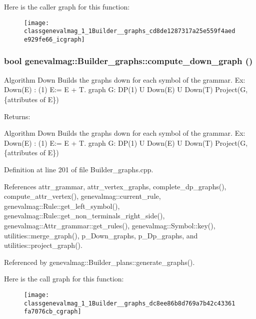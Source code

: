 Here is the caller graph for this function:\nopagebreak
\begin{figure}[H]
\begin{center}
\leavevmode
\texttt{[image: classgenevalmag\_1\_1Builder\_\_graphs\_cd8de1287317a25e559f4aede929fe66\_icgraph]}
\end{center}
\end{figure}
\hypertarget{classgenevalmag_1_1Builder__graphs_dc8ee86b8d769a7b42c43361fa7076cb}{
\subsubsection[{compute\_\-down\_\-graph}]{\setlength{\rightskip}{0pt plus 5cm}bool genevalmag::Builder\_\-graphs::compute\_\-down\_\-graph ()}}
\label{classgenevalmag_1_1Builder__graphs_dc8ee86b8d769a7b42c43361fa7076cb}


Algorithm Down Builds the graphs down for each symbol of the grammar. Ex: Down(E) : (1) E:= E + T. graph G: DP(1) U Down(E) U Down(T) Project(G,\{attributes of E\}) \begin{Desc}
\item[Returns:]\end{Desc}
Algorithm Down Builds the graphs down for each symbol of the grammar. Ex: Down(E) : (1) E:= E + T. graph G: DP(1) U Down(E) U Down(T) Project(G,\{attributes of E\}) 

Definition at line 201 of file Builder\_\-graphs.cpp.

References attr\_\-grammar, attr\_\-vertex\_\-graphs, complete\_\-dp\_\-graphs(), compute\_\-attr\_\-vertex(), genevalmag::current\_\-rule, genevalmag::Rule::get\_\-left\_\-symbol(), genevalmag::Rule::get\_\-non\_\-terminals\_\-right\_\-side(), genevalmag::Attr\_\-grammar::get\_\-rules(), genevalmag::Symbol::key(), utilities::merge\_\-graph(), p\_\-Down\_\-graphs, p\_\-Dp\_\-graphs, and utilities::project\_\-graph().

Referenced by genevalmag::Builder\_\-plans::generate\_\-graphs().

Here is the call graph for this function:\nopagebreak
\begin{figure}[H]
\begin{center}
\leavevmode
\texttt{[image: classgenevalmag\_1\_1Builder\_\_graphs\_dc8ee86b8d769a7b42c43361fa7076cb\_cgraph]}
\end{center}
\end{figure}


